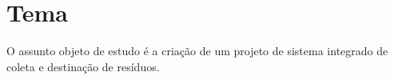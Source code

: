 \section{Tema}

  O assunto objeto de estudo é a criação de um projeto
  de sistema integrado de coleta e destinação de resíduos.
